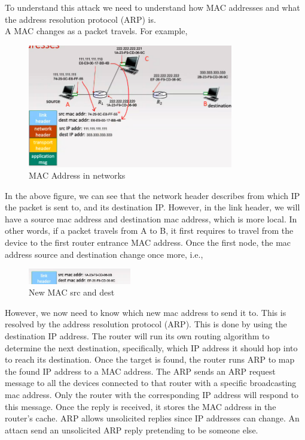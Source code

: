 \documentclass[a4paper]{article}
\theoremstyle{plain}
\theoremstyle{definition}
\newtheorem{defn}{Definition}[section]
\theoremstyle{remark}
\begin{document}
\begin{tcolorbox}[colback=black!3!white,colframe=black!60!white,title=\begin{defn}ARP Cache Poisoning Attack \label{ARP Cache Poisoning Attack}\end{defn}]
To understand this attack we need to understand how MAC addresses and what the address resolution protocol (ARP) is. \\

A MAC changes as a packet travels. For example, 
\begin{figure}[H]
	\centering
	\includegraphics[width=0.8\textwidth]{thirtyfour.png}
	\caption{MAC Address in networks}
	\label{fig:thirtyfour-png}
\end{figure}
In the above figure, we can see that the network header describes from which IP the packet is sent to, and its destination IP. However, in the link header, we will have a source mac address and destination mac address, which is more local. In other words, if a packet travels from A to B, it first requires to travel from the device to the first router entrance MAC address. Once the first node, the mac address source and destination change once more, i.e.,
\begin{figure}[H]
	\centering
	\includegraphics[width=0.4\textwidth]{thirtyfive.png}
	\caption{New MAC src and dest}
	\label{fig:thirtyfive-png}
\end{figure}
However, we now need to know which new mac address to send it to. This is resolved by the address resolution protocol (ARP). This is done by using the destination IP address. The router will run its own routing algorithm to determine the next destination, specifically, which IP address it should hop into to reach its destination. Once the target is found, the router runs ARP to map the found IP address to a MAC address. The ARP sends an ARP request message to all the devices connected to that router with a specific broadcasting mac address. Only the router with the corresponding IP address will respond to this message. Once the reply is received, it stores the MAC address in the router's cache. ARP allows unsolicited replies since IP addresses can change. An attacn send an unsolicited ARP reply pretending to be someone else.
\end{tcolorbox}
\end{document}
